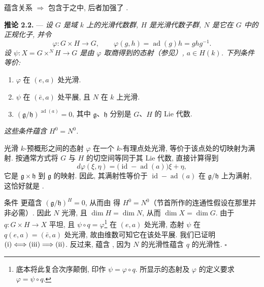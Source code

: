 蕴含关系  \(\Rightarrow\)  包含于之中, 后者加强了 .

\medskip
\noindent{}\textbf{推论 2.2.} ---
\textit{设 \(G\) 是域 \(k\) 上的光滑代数群, \(H\) 是光滑代数子群, \(N\) 是它在 \(G\) 中的正规化子, 并令}
\[
  \varphi:G\times H\longrightarrow G,\qquad
  \varphi(g,h)=\operatorname{ad}(g)h=ghg^{-1}.
\]
\textit{设 \(\psi:X=G\times^N H\to G\) 是由 \(\varphi\) 取商得到的态射（参见）, \(a\in H(k)\). 下列条件等价:}

\begin{enumerate}
\item[(i)] 
  \(\varphi\) 在 \((e,a)\) 处光滑.
\item[(ii)] 
  \(\psi\) 在 \((\bar e,a)\) 处平展, 且 \(N\) 在 \(k\) 上光滑.
\item[(iii)] 
  \((\mathfrak g/\mathfrak h)^{\operatorname{ad}(a)}=0\), 其中 \(\mathfrak g\)、\(\mathfrak h\) 分别是 \(G\)、\(H\) 的 Lie 代数.
\end{enumerate}

\textit{这些条件蕴含 \(H^0=N^0\).}

光滑 \(k\)-预概形之间的态射 \(\varphi\) 在一个 \(k\)-有理点处光滑, 等价于该点处的切映射为满射. 按通常方式将 \(G\) 与 \(H\) 的切空间等同于其 Lie 代数, 直接计算得到
\[
  d\varphi(\xi,\eta)
  =\bigl(\operatorname{id}-\operatorname{ad}(a)\bigr)\xi+\eta,
\]
它是 \(\mathfrak g\times\mathfrak h\) 到 \(\mathfrak g\) 的映射. 因此, 其满射性等价于 \(\operatorname{id}-\operatorname{ad}(a)\) 在 \(\mathfrak g/\mathfrak h\) 上为满射, 这恰好就是 .

条件  更蕴含 \((\mathfrak g/\mathfrak h)^H=0\), 从而由  得 \(H^0=N^0\)（节首所作的连通性假设在那里并非必需）. 因此 \(N\) 光滑, 且 \(\dim H=\dim N\), 从而 \(\dim X=\dim G\). 由于 \(q:G\times H\to X\) 平坦, 且 \(\psi\circ q=\varphi\)\footnote{底本将此复合次序颠倒, 印作 \(\psi=\varphi\circ q\). 所显示的态射及 \(\varphi\) 的定义要求 \(\varphi=\psi\circ q\).} 在 \((e,a)\) 处光滑, 态射 \(\psi\) 在 \(q(e,a)=(\bar e,a)\) 处光滑, 故由维数可知它在该处平展. 我们已证明 \(\SGARefLink{sga3:xiii:corollary:2:2:item:i}{\mathrm{(i)}}\Longleftrightarrow\SGARefLink{sga3:xiii:corollary:2:2:item:iii}{\mathrm{(iii)}}\Longrightarrow\SGARefLink{sga3:xiii:corollary:2:2:item:ii}{\mathrm{(ii)}}\). 反过来,  蕴含 , 因为 \(N\) 的光滑性蕴含 \(q\) 的光滑性.
\hfill\(\square\)

